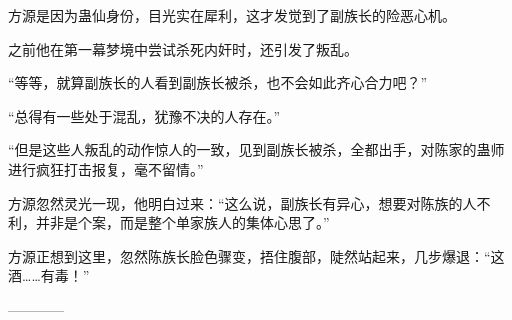 \begin{this_body}
方源是因为蛊仙身份，目光实在犀利，这才发觉到了副族长的险恶心机。

之前他在第一幕梦境中尝试杀死内奸时，还引发了叛乱。

“等等，就算副族长的人看到副族长被杀，也不会如此齐心合力吧？”

“总得有一些处于混乱，犹豫不决的人存在。”

“但是这些人叛乱的动作惊人的一致，见到副族长被杀，全都出手，对陈家的蛊师进行疯狂打击报复，毫不留情。”

方源忽然灵光一现，他明白过来：“这么说，副族长有异心，想要对陈族的人不利，并非是个案，而是整个单家族人的集体心思了。”

方源正想到这里，忽然陈族长脸色骤变，捂住腹部，陡然站起来，几步爆退：“这酒……有毒！”

------------

\end{this_body}

